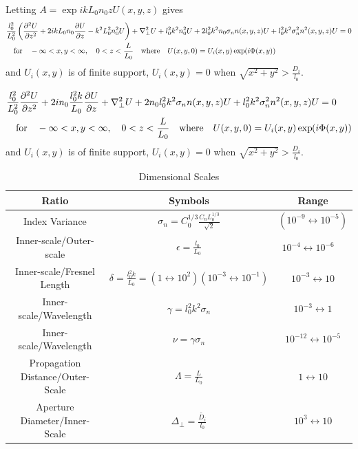 Letting $A = \exp{i k L_0 n_0 z} U(x,y,z)$ gives
\begin{equation}\label{equ:helmholtz_equation_3}
\begin{split}
  & \frac{l_0^2}{L_0^2} \left( \ppder{U}{z}  + 2i k L_0 n_0 \pder{U}{z} - k^2 L_0^2 n_0^2 U \right) 
  + \nabla_{\perp}^2 U + l_0^2 k^2 n_0^2 U + 2 l_0^2 k^2 n_0 \sigma_n n(x,y,z) U 
  + l_0^2 k^2 \sigma_n^2 n^2(x,y,z) U = 0 \\
  &\quad  \mbox{for}   
  \quad -\infty < x,y < \infty, \quad 0 < z < \frac{L}{L_0} 
  \quad \mbox{where} \quad U(x,y,0) = U_{i}(x,y) \exp{i\Phi(x,y)}
\end{split}
\end{equation}
and $U_{i}(x,y)$ is of finite support, \ie $U_{i}(x,y) = 0$ when 
$\sqrt{x^2 + y^2} > \frac{D_{i}}{l_0}$. 

\begin{equation}
\begin{split}
  & \frac{l_0^2}{L_0^2} \ppder{U}{z} + 2i n_0 \frac{l_0^2 k}{L_0} \pder{U}{z} + \nabla_{\perp}^2 U 
   +  2n_0  l_0^2 k^2 \sigma_n n(x,y,z)U + l_0^2 k^2 \sigma_n^2 n^2(x,y,z) U = 0 \\
  &\quad  \mbox{for}   
  \quad -\infty < x,y < \infty, \quad 0 < z < \frac{L}{L_0} \quad  \mbox{where} \quad U(x,y,0) = U_{i}(x,y)\exp{i \Phi(x,y)}
\end{split}
\end{equation}
and $U_{i}(x,y)$ is of finite support, \ie $U_{i}(x,y) = 0$ when $\sqrt{x^2 + y^2} > \frac{D_{i}}{l_0}$.

\begin{table}[htp]
\begin{center}
\begin{tabular}{|c|c|c|}
\hline
Ratio                      & Symbols                          & Range        \\       
\hline
\hline
Index Variance             & $\sigma_n =  C_0^{1/3} \frac{C_n L_0^{1/3}}{\sqrt{2}}$   & $ (10^{-9}\leftrightarrow 10^{-5})$ \\ 
\hline
Inner-scale/Outer-scale    & $\epsilon = \frac{l_0}{L_0}$     & $10^{-4} \leftrightarrow 10^{-6}\quad$    \\                  
\hline
Inner-scale/Fresnel Length &  $\delta = \frac{l_0^2 k }{L_0} = (1 \leftrightarrow 10^{2})(10^{-3}\leftrightarrow 10^{-1}) $ & $10^{-3} \leftrightarrow 10$  \\
\hline
Inner-scale/Wavelength     & $\gamma = l_0^2 k^2 \sigma_n$    & $10^{-3} \leftrightarrow 1$  \\
\hline
Inner-scale/Wavelength     & $\nu   = \gamma \sigma_n$        & $10^{-12} \leftrightarrow 10^{-5}$  \\ 
\hline   
Propagation Distance/Outer-Scale & $\Lambda = \frac{L}{L_0}$  & $1 \leftrightarrow 10$ \\
\hline
Aperture Diameter/Inner-Scale    & $\Delta_{\perp} = \frac{\tilde{D_{i}}}{l_0}$  & $10^3 \leftrightarrow 10$ \\
\hline
\end{tabular}
\end{center}
\caption{Dimensional Scales}
\label{Dimensional Scales}
\end{table}

